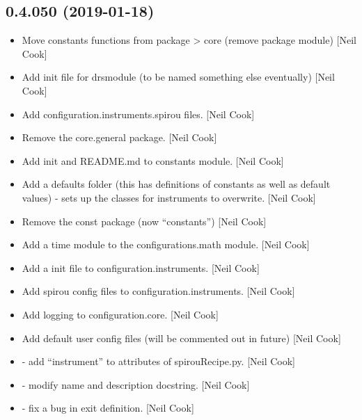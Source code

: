 \documentclass[a4paper,10pt,english]{report}
\begin{document}
\subsection{0.4.050 (2019-01-18)}
\label{\detokenize{misc/changelog:id214}}\begin{itemize}
\item {} 
Move constants functions from package \textendash{}\textgreater{} core (remove package module)
{[}Neil Cook{]}

\item {} 
Add init file for drsmodule (to be named something else eventually)
{[}Neil Cook{]}

\item {} 
Add configuration.instruments.spirou files. {[}Neil Cook{]}

\item {} 
Remove the core.general package. {[}Neil Cook{]}

\item {} 
Add init and README.md to constants module. {[}Neil Cook{]}

\item {} 
Add a defaults folder (this has definitions of constants as well as
default values) - sets up the classes for instruments to overwrite.
{[}Neil Cook{]}

\item {} 
Remove the const package (now “constants”) {[}Neil Cook{]}

\item {} 
Add a time module to the configurations.math module. {[}Neil Cook{]}

\item {} 
Add a init file to configuration.instruments. {[}Neil Cook{]}

\item {} 
Add spirou config files to configuration.instruments. {[}Neil Cook{]}

\item {} 
Add logging to configuration.core. {[}Neil Cook{]}

\item {} 
Add default user config files (will be commented out in future) {[}Neil
Cook{]}

\item {} 
 - add “instrument” to attributes of spirouRecipe.py.
{[}Neil Cook{]}

\item {} 
 - modify name and description docstring. {[}Neil Cook{]}

\item {} 
 - fix a bug in exit definition. {[}Neil Cook{]}

\end{itemize}
\end{document}
